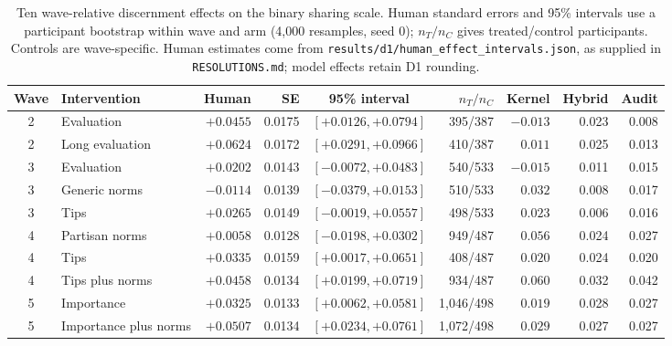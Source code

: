 \documentclass[11pt]{article}
\begin{document}
\begin{table}[!htbp]
\centering\small
\caption{Ten wave-relative discernment effects on the binary sharing scale. Human standard errors and 95\% intervals use a participant bootstrap within wave and arm (4,000 resamples, seed 0); $n_T/n_C$ gives treated/control participants. Controls are wave-specific. Human estimates come from \texttt{results/d1/human\_effect\_intervals.json}, as supplied in \texttt{RESOLUTIONS.md}; model effects retain D1 rounding.}\label{tab:human-effects}
\footnotesize\setlength{\tabcolsep}{3pt}
\begin{tabular}{@{}clrrcrrrr@{}}
\toprule
Wave & Intervention & Human & SE & 95\% interval & $n_T/n_C$ & Kernel & Hybrid & Audit\\
\midrule
2 & Evaluation & $+0.0455$ & 0.0175 & $[+0.0126, +0.0794]$ & 395/387 & $-0.013$ & 0.023 & 0.008\\
2 & Long evaluation & $+0.0624$ & 0.0172 & $[+0.0291, +0.0966]$ & 410/387 & $0.011$ & 0.025 & 0.013\\
3 & Evaluation & $+0.0202$ & 0.0143 & $[-0.0072, +0.0483]$ & 540/533 & $-0.015$ & 0.011 & 0.015\\
3 & Generic norms & $-0.0114$ & 0.0139 & $[-0.0379, +0.0153]$ & 510/533 & $0.032$ & 0.008 & 0.017\\
3 & Tips & $+0.0265$ & 0.0149 & $[-0.0019, +0.0557]$ & 498/533 & $0.023$ & 0.006 & 0.016\\
4 & Partisan norms & $+0.0058$ & 0.0128 & $[-0.0198, +0.0302]$ & 949/487 & $0.056$ & 0.024 & 0.027\\
4 & Tips & $+0.0335$ & 0.0159 & $[+0.0017, +0.0651]$ & 408/487 & $0.020$ & 0.024 & 0.020\\
4 & Tips plus norms & $+0.0458$ & 0.0134 & $[+0.0199, +0.0719]$ & 934/487 & $0.060$ & 0.032 & 0.042\\
5 & Importance & $+0.0325$ & 0.0133 & $[+0.0062, +0.0581]$ & 1,046/498 & $0.019$ & 0.028 & 0.027\\
5 & Importance plus norms & $+0.0507$ & 0.0134 & $[+0.0234, +0.0761]$ & 1,072/498 & $0.029$ & 0.027 & 0.027\\
\bottomrule
\end{tabular}
\end{table}
\end{document}
